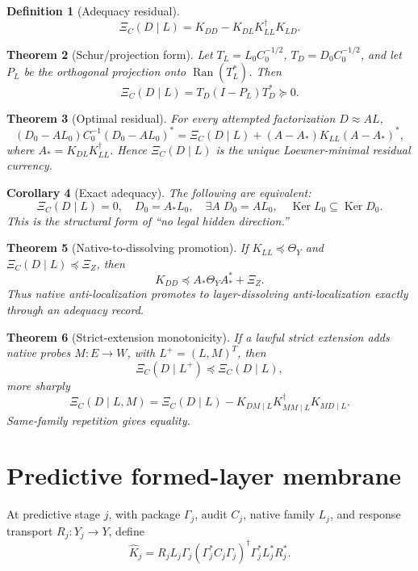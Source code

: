 \documentclass[11pt]{article}
\newtheorem{theorem}{Theorem}[section]
\newtheorem{corollary}[theorem]{Corollary}
\newtheorem{definition}[theorem]{Definition}
\DeclareMathOperator{\Ran}{Ran}
\DeclareMathOperator{\Ker}{Ker}
\begin{document}
\begin{definition}[Adequacy residual]
\[
\boxed{\Xi_C(D\mid L)=K_{DD}-K_{DL}K_{LL}^\dagger K_{LD}.}
\]
\end{definition}

\begin{theorem}[Schur/projection form]
Let \(T_L=L_0C_0^{-1/2}\), \(T_D=D_0C_0^{-1/2}\), and let \(P_L\) be the orthogonal projection onto \(\Ran(T_L^*)\).  Then
\[
  \Xi_C(D\mid L)=T_D(I-P_L)T_D^*\succeq0.
\]
\end{theorem}

\begin{theorem}[Optimal residual]
For every attempted factorization \(D\approx AL\),
\[
(D_0-AL_0)C_0^{-1}(D_0-AL_0)^*
=\Xi_C(D\mid L)+(A-A_*)K_{LL}(A-A_*)^*,
\]
where \(A_*=K_{DL}K_{LL}^\dagger\).  Hence \(\Xi_C(D\mid L)\) is the unique Loewner-minimal residual currency.
\end{theorem}

\begin{corollary}[Exact adequacy]
The following are equivalent:
\[
\Xi_C(D\mid L)=0,
\quad D_0=A_*L_0,
\quad \exists A\;D_0=AL_0,
\quad \Ker L_0\subseteq\Ker D_0.
\]
This is the structural form of ``no legal hidden direction.''
\end{corollary}

\begin{theorem}[Native-to-dissolving promotion]
If \(K_{LL}\preceq\Theta_Y\) and \(\Xi_C(D\mid L)\preceq\Xi_Z\), then
\[
  K_{DD}\preceq A_*\Theta_YA_*^*+\Xi_Z.
\]
Thus native anti-localization promotes to layer-dissolving anti-localization exactly through an adequacy record.
\end{theorem}

\begin{theorem}[Strict-extension monotonicity]
If a lawful strict extension adds native probes \(M:E\to W\), with \(L^+=(L,M)^T\), then
\[
  \Xi_C(D\mid L^+)\preceq \Xi_C(D\mid L),
\]
more sharply
\[
  \Xi_C(D\mid L,M)=\Xi_C(D\mid L)-K_{DM\mid L}K_{MM\mid L}^\dagger K_{MD\mid L}.
\]
Same-family repetition gives equality.
\end{theorem}

\section{Predictive formed-layer membrane}
At predictive stage \(j\), with package \(\Gamma_j\), audit \(C_j\), native family \(L_j\), and response transport \(R_j:Y_j\to Y\), define
\[
  \widehat K_j=R_jL_j\Gamma_j(\Gamma_j^*C_j\Gamma_j)^\dagger\Gamma_j^*L_j^*R_j^*.
\]
\end{document}
